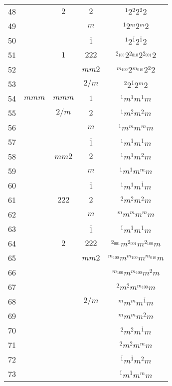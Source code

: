 \begin{longtable}{ccccc}
  48 &  & $2$ & $2$ & ${}^{1} 2 {}^{2} 2 {}^{2} 2 $\\
  49 &  &  & $m$ & ${}^{1} 2 {}^{m} 2 {}^{m} 2 $\\
  50 &  &  & $\overline{1}$ & ${}^{1} 2 {}^{\overline{1}} 2 {}^{\overline{1}} 2 $\\
  51 &  & $1$ & $222$ & ${}^{2_{100}} 2 {}^{2_{010}} 2 {}^{2_{001}} 2 $\\
  52 &  &  & $mm2$ & ${}^{m_{100}} 2 {}^{m_{010}} 2 {}^{2} 2 $\\
  53 &  &  & $2/m$ & ${}^{2} 2 {}^{\overline{1}} 2 {}^{m} 2 $\\
  54 & $mmm$ & $mmm$ & $1$ & ${}^{1} m {}^{1} m {}^{1} m $\\
  55 &  & $2/m$ & $2$ & ${}^{1} m {}^{2} m {}^{2} m $\\
  56 &  &  & $m$ & ${}^{1} m {}^{m} m {}^{m} m $\\
  57 &  &  & $\overline{1}$ & ${}^{1} m {}^{\overline{1}} m {}^{\overline{1}} m $\\
  58 &  & $mm2$ & $2$ & ${}^{1} m {}^{1} m {}^{2} m $\\
  59 &  &  & $m$ & ${}^{1} m {}^{1} m {}^{m} m $\\
  60 &  &  & $\overline{1}$ & ${}^{1} m {}^{1} m {}^{\overline{1}} m $\\
  61 &  & $222$ & $2$ & ${}^{2} m {}^{2} m {}^{2} m $\\
  62 &  &  & $m$ & ${}^{m} m {}^{m} m {}^{m} m $\\
  63 &  &  & $\overline{1}$ & ${}^{\overline{1}} m {}^{\overline{1}} m {}^{\overline{1}} m $\\
  64 &  & $2$ & $222$ & ${}^{2_{001}} m {}^{2_{001}} m {}^{2_{100}} m $\\
  65 &  &  & $mm2$ & ${}^{m_{100}} m {}^{m_{100}} m {}^{m_{010}} m $\\
  66 &  &  &  & ${}^{m_{100}} m {}^{m_{100}} m {}^{2} m $\\
  67 &  &  &  & ${}^{2} m {}^{2} m {}^{m_{100}} m $\\
  68 &  &  & $2/m$ & ${}^{m} m {}^{m} m {}^{\overline{1}} m $\\
  69 &  &  &  & ${}^{m} m {}^{m} m {}^{2} m $\\
  70 &  &  &  & ${}^{2} m {}^{2} m {}^{\overline{1}} m $\\
  71 &  &  &  & ${}^{2} m {}^{2} m {}^{m} m $\\
  72 &  &  &  & ${}^{\overline{1}} m {}^{\overline{1}} m {}^{2} m $\\
  73 &  &  &  & ${}^{\overline{1}} m {}^{\overline{1}} m {}^{m} m $\\

\end{longtable}
